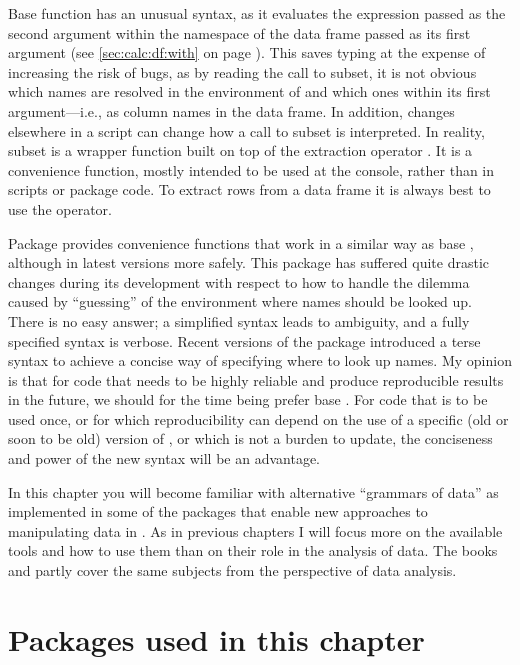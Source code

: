 \documentclass[krantz2]{krantz}\usepackage{knitr}
\begin{document}
Base \Rlang function  has an unusual syntax, as it evaluates the expression passed as the second argument within the namespace of the data frame passed as its first argument (see \ref{sec:calc:df:with} on page \pageref{sec:calc:df:with}). This saves typing at the expense of increasing the risk of bugs, as by reading the call to subset, it is not obvious which names are resolved in the environment of  and which ones within its first argument---i.e., as column names in the data frame. In addition, changes elsewhere in a script can change how a call to subset is interpreted. In reality, subset is a wrapper function built on top of the extraction operator \code{[]}. It is a convenience function, mostly intended to be used at the console, rather than in scripts or package code. To extract rows from a data frame it is always best to use the \code{[ , ]} operator.

Package  provides convenience functions that work in a similar way as base \Rlang {}, although in latest versions more safely. This package has suffered quite drastic changes during its development with respect to how to handle the dilemma caused by ``guessing'' of the environment where names should be looked up. There is no easy answer; a simplified syntax leads to ambiguity, and a fully specified syntax is verbose. Recent versions of the package introduced a terse syntax to achieve a concise way of specifying where to look up  names. My opinion is that for code that needs to be highly reliable and produce reproducible results in the future, we should for the time being prefer base \Rlang. For code that is to be used once, or for which reproducibility can depend on the use of a specific (old or soon to be old) version of , or which is not a burden to update, the conciseness and power of the new syntax will be an advantage.

In this chapter you will become familiar with alternative ``grammars of data'' as implemented in some of the packages that enable new approaches to manipulating data in \Rlang. As in previous chapters I will focus more on the available tools and how to use them than on their role in the analysis of data. The books  \autocite{Wickham2017} and  \autocite{Peng2016} partly cover the same subjects from the perspective of data analysis.

\section{Packages used in this chapter}
\end{document}
